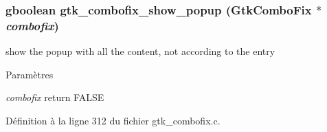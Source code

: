 \subsubsection[{gtk\_\-combofix\_\-show\_\-popup}]{\setlength{\rightskip}{0pt plus 5cm}gboolean gtk\_\-combofix\_\-show\_\-popup ({\bf GtkComboFix} $\ast$ {\em combofix})}\label{gtk__combofix_8c_a39a306b39734cda29d4ba4dddd589a26}
show the popup with all the content, not according to the entry


\begin{DoxyParams}{Paramètres}
\item[{\em combofix}]return FALSE \end{DoxyParams}


Définition à la ligne 312 du fichier gtk\_\-combofix.c.

